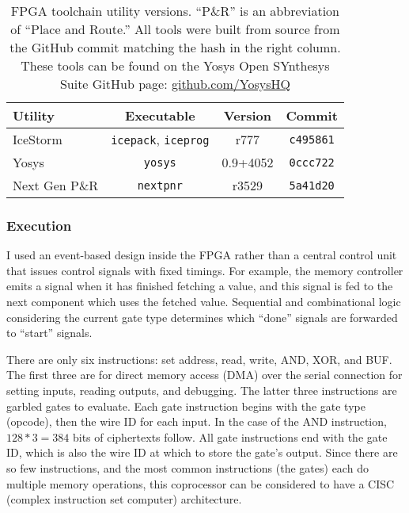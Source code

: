 \begin{table}[ht]
	\centering
	\begin{tabular}{l c c c}
		\toprule
		Utility       & Executable                         & Version  & Commit \\
		\midrule
		IceStorm      & \texttt{icepack}, \texttt{iceprog} & r777     & \texttt{c495861} \\
		Yosys         & \texttt{yosys}                     & 0.9+4052 & \texttt{0ccc722} \\
		Next Gen P\&R & \texttt{nextpnr}                   & r3529    & \texttt{5a41d20} \\
		\bottomrule
	\end{tabular}
	\caption{FPGA toolchain utility versions. ``P\&R'' is an abbreviation of ``Place and Route.'' All tools were built from source from the GitHub commit matching the hash in the right column. These tools can be found on the Yosys Open SYnthesys Suite GitHub page: \url{github.com/YosysHQ}}%
	\label{tab:versions}
\end{table}

\subsubsection{Execution}

I used an event-based design inside the FPGA rather than a central control unit that issues control signals with fixed timings. For example, the memory controller emits a signal when it has finished fetching a value, and this signal is fed to the next component which uses the fetched value. Sequential and combinational logic considering the current gate type determines which ``done'' signals are forwarded to ``start'' signals.

There are only six instructions: set address, read, write, AND, XOR, and BUF. The first three are for direct memory access (DMA) over the serial connection for setting inputs, reading outputs, and debugging. The latter three instructions are garbled gates to evaluate. Each gate instruction begins with the gate type (opcode), then the wire ID for each input. In the case of the AND instruction, $128*3=384$ bits of ciphertexts follow. All gate instructions end with the gate ID, which is also the wire ID at which to store the gate's output. Since there are so few instructions, and the most common instructions (the gates) each do multiple memory operations, this coprocessor can be considered to have a CISC (complex instruction set computer) architecture.

